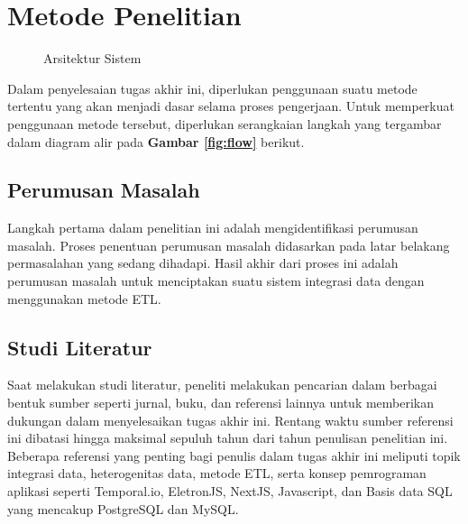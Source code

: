 \section{Metode Penelitian}
\label{sec:arsitektur}


\begin{figure}
  \centering
  \hfil
  \caption{Arsitektur Sistem}
  \label{fig:structure-system}
\end{figure}

Dalam penyelesaian tugas akhir ini, diperlukan penggunaan suatu metode tertentu yang akan menjadi dasar selama proses pengerjaan. Untuk memperkuat penggunaan metode tersebut, diperlukan serangkaian langkah yang tergambar dalam diagram alir pada \textbf{Gambar \ref{fig:flow}} berikut.

\subsection{Perumusan Masalah}
Langkah pertama dalam penelitian ini adalah mengidentifikasi perumusan masalah. Proses penentuan perumusan masalah didasarkan pada latar belakang permasalahan yang sedang dihadapi. Hasil akhir dari proses ini adalah perumusan masalah untuk menciptakan suatu sistem integrasi data dengan menggunakan metode ETL.

\subsection{Studi Literatur}
Saat melakukan studi literatur, peneliti melakukan pencarian dalam berbagai bentuk sumber seperti jurnal, buku, dan referensi lainnya untuk memberikan dukungan dalam menyelesaikan tugas akhir ini. Rentang waktu sumber referensi ini dibatasi hingga maksimal sepuluh tahun dari tahun penulisan penelitian ini. Beberapa referensi yang penting bagi penulis dalam tugas akhir ini meliputi topik integrasi data, heterogenitas data, metode ETL, serta konsep pemrograman aplikasi seperti Temporal.io, EletronJS, NextJS, Javascript, dan Basis data SQL yang mencakup PostgreSQL dan MySQL.

